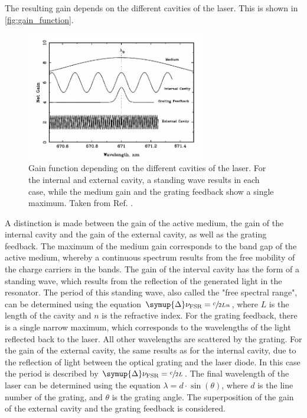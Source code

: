 The resulting gain depends on the different cavities of the laser.
This is shown in \autoref{fig:gain_function}.
\begin{figure}
    \centering
    \includegraphics[width=0.7\textwidth]{content/img/p9_Fig5.png}
    \caption{Gain function depending on the different cavities of the laser.
    For the internal and external cavity,
    a standing wave results in each case,
    while the medium gain and the grating feedback show a single maximum.
    Taken from Ref. \cite{versuchsanleitung}.}
    \label{fig:gain_function}
\end{figure}
A distinction is made between the gain of the active medium,
the gain of the internal cavity and the gain of the external cavity,
as well as the grating feedback.
The maximum of the medium gain corresponds to the band gap of the active medium,
whereby a continuous spectrum results from the free mobility of the charge carriers in the bands.
The gain of the interval cavity has the form of a standing wave,
which results from the reflection of the generated light in the resonator.
The period of this standing wave,
also called the "free spectral range",
can be determined using the equation $\symup{\Delta}\nu_\text{FSR} = \sfrac{c}{2Ln}$,
where $L$ is the length of the cavity and $n$ is the refractive index.
For the grating feedback, there is a single narrow maximum,
which corresponds to the wavelengths of the light reflected back to the laser.
All other wavelengths are scattered by the grating.
For the gain of the external cavity, the same results as for the internal cavity,
due to the reflection of light between the optical grating and the laser diode.
In this case the period is described by $\symup{\Delta}\nu_\text{FSR} = \sfrac{c}{2L}$.
The final wavelength of the laser can be determined using the equation $\lambda = d \cdot \sin{(\theta)}$,
where $d$ is the line number of the grating,
and $\theta$ is the grating angle.
The superposition of the gain of the external cavity and the grating feedback is considered.

